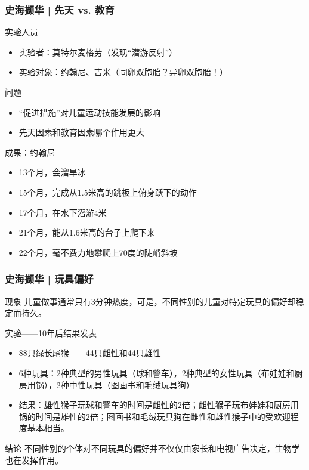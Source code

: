 \begin{frame}
  \frametitle{史海撷华 | 先天 vs. 教育}
  \begin{block}{实验人员}
    \begin{itemize}
      \item 实验者：莫特尔\textbullet 麦格劳（发现“潜游反射”）
      \item 实验对象：约翰尼、吉米（同卵双胞胎？异卵双胞胎！）
    \end{itemize}
  \end{block}
  \vspace{-0.5em}
  \pause
  \begin{block}{问题}
    \begin{itemize}
      \item “促进措施”对儿童运动技能发展的影响
      \item 先天因素和教育因素哪个作用更大
    \end{itemize}
  \end{block}
  \vspace{-0.5em}
  \pause
  \begin{block}{成果：约翰尼}
    \begin{itemize}
      \item 13个月，会溜旱冰
      \item 15个月，完成从1.5米高的跳板上俯身跃下的动作
      \item 17个月，在水下潜游4米
      \item 21个月，能从1.6米高的台子上爬下来
      \item 22个月，毫不费力地攀爬上70度的陡峭斜坡
    \end{itemize}
  \end{block}
\end{frame}

\begin{frame}
  \frametitle{史海撷华 | 玩具偏好}
  \begin{block}{现象}
    儿童做事通常只有3分钟热度，可是，不同性别的儿童对特定玩具的偏好却稳定而持久。
  \end{block}
  \vspace{-0.5em}
  \pause
  \begin{block}{实验——10年后结果发表}
    \begin{itemize}
      \item 88只绿长尾猴——44只雌性和44只雄性
      \item 6种玩具：2种典型的男性玩具（球和警车），2种典型的女性玩具（布娃娃和厨房用锅），2种中性玩具（图画书和毛绒玩具狗）
      \item 结果：雄性猴子玩球和警车的时间是雌性的2倍；雌性猴子玩布娃娃和厨房用锅的时间是雄性的2倍；图画书和毛绒玩具狗在雌性和雄性猴子中的受欢迎程度基本相当。
    \end{itemize}
  \end{block}
  \vspace{-0.5em}
  \pause
  \begin{block}{结论}
    不同性别的个体对不同玩具的偏好并不仅仅由家长和电视广告决定，生物学也在发挥作用。
  \end{block}
\end{frame}


